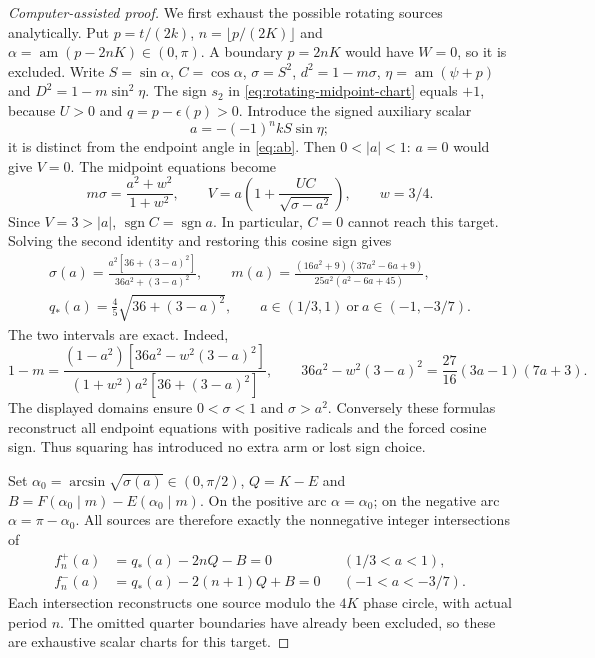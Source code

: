 \documentclass[11pt,a4paper]{article}
\theoremstyle{remark}\newtheorem{remark}[theorem]{Remark}
\begin{document}
\begin{proof}[Computer-assisted proof]
We first exhaust the possible rotating sources analytically. Put
$p=t/(2k)$, $n=\lfloor p/(2K)\rfloor$ and
$\alpha=\operatorname{am}(p-2nK)\in(0,\pi)$.
A boundary $p=2nK$ would have $W=0$, so it is excluded.
Write $S=\sin\alpha$, $C=\cos\alpha$, $\sigma=S^2$,
$d^2=1-m\sigma$, $\eta=\operatorname{am}(\psi+p)$ and
$D^2=1-m\sin^2\eta$. The sign $s_2$ in
\eqref{eq:rotating-midpoint-chart} equals $+1$, because $U>0$ and
$q=p-\epsilon(p)>0$. Introduce the signed auxiliary scalar
\[
 a=-(-1)^n kS\sin\eta;
\]
it is distinct from the endpoint angle in \eqref{eq:ab}. Then
$0<|a|<1$: $a=0$ would give $V=0$. The midpoint equations become
\[
 m\sigma=\frac{a^2+w^2}{1+w^2},\qquad
 V=a\left(1+\frac{UC}{\sqrt{\sigma-a^2}}\right),\qquad w=3/4.
\]
Since $V=3>|a|$, $\operatorname{sgn}C=\operatorname{sgn}a$.
In particular, $C=0$ cannot reach this target. Solving the second
identity and restoring this cosine sign gives
\begin{equation}\label{eq:nine-source-arcs}
 \begin{gathered}
 \sigma(a)=\frac{a^2[36+(3-a)^2]}{36a^2+(3-a)^2},\qquad
 m(a)=\frac{(16a^2+9)(37a^2-6a+9)}{25a^2(a^2-6a+45)},\\
 q_*(a)=\frac45\sqrt{36+(3-a)^2},\qquad
 a\in(1/3,1)\ \text{or}\ a\in(-1,-3/7).
 \end{gathered}
\end{equation}
The two intervals are exact. Indeed,
\[
 1-m=\frac{(1-a^2)[36a^2-w^2(3-a)^2]}
 {(1+w^2)a^2[36+(3-a)^2]},\qquad
 36a^2-w^2(3-a)^2=\frac{27}{16}(3a-1)(7a+3).
\]
The displayed domains ensure $0<\sigma<1$ and $\sigma>a^2$.
Conversely these formulas reconstruct all endpoint equations with
positive radicals and the forced cosine sign. Thus squaring has
introduced no extra arm or lost sign choice.

Set $\alpha_0=\arcsin\sqrt{\sigma(a)}\in(0,\pi/2)$,
$Q=K-E$ and $B=F(\alpha_0\mid m)-E(\alpha_0\mid m)$.
On the positive arc $\alpha=\alpha_0$; on the negative arc
$\alpha=\pi-\alpha_0$. All sources are therefore exactly the
nonnegative integer intersections of
\begin{equation}\label{eq:nine-source-scalars}
 \begin{aligned}
 f_n^+(a)&=q_*(a)-2nQ-B=0 &&(1/3<a<1),\\
 f_n^-(a)&=q_*(a)-2(n+1)Q+B=0 &&(-1<a<-3/7).
 \end{aligned}
\end{equation}
Each intersection reconstructs one source modulo the $4K$ phase circle,
with actual period $n$. The omitted quarter boundaries have already
been excluded, so these are exhaustive scalar charts for this target.


\end{proof}
\end{document}
